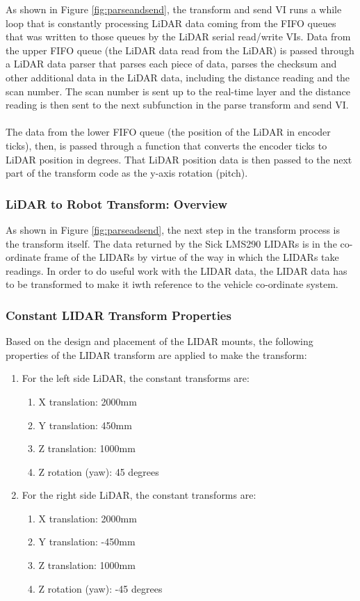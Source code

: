 \noindent As shown in Figure \ref{fig:parseandsend}, the transform and send VI runs a while loop that is constantly processing LiDAR data coming from the FIFO queues that was written to those queues by the LiDAR serial read/write VIs. Data from the upper FIFO queue (the LiDAR data read from the LiDAR) is passed through a LiDAR data parser that parses each piece of data, parses the checksum and other additional data in the LiDAR data, including the distance reading and the scan number. The scan number is sent up to the real-time layer and the distance reading is then sent to the next subfunction in the parse transform and send VI. \\ \\
%
The data from the lower FIFO queue (the position of the LiDAR in encoder ticks), then, is passed through a function that converts the encoder ticks to LiDAR position in degrees. That LiDAR position data is then passed to the next part of the transform code as the y-axis rotation (pitch).

\subsubsection{LiDAR to Robot Transform: Overview}
As shown in Figure \ref{fig:parseadsend}, the next step in the transform process is the transform itself. The data returned by the Sick LMS290 LIDARs is in the co-ordinate frame of the LIDARs by virtue of the way in which the LIDARs take readings. In order to do useful work with the LIDAR data, the LIDAR data has to be transformed to make it iwth reference to the vehicle co-ordinate system.

\subsubsection{Constant LIDAR Transform Properties}
Based on the design and placement of the LIDAR mounts, the following properties of the LIDAR transform are applied to make the transform:

\begin{enumerate}
\item For the left side LiDAR, the constant transforms are:
\begin{enumerate}
\item X translation: 2000mm
\item Y translation: 450mm
\item Z translation: 1000mm
\item Z rotation (yaw): 45 degrees
\end{enumerate}
\item For the right side LiDAR, the constant transforms are:
\begin{enumerate}
\item X translation: 2000mm
\item Y translation: -450mm
\item Z translation: 1000mm
\item Z rotation (yaw): -45 degrees
\end{enumerate}
\end{enumerate}

